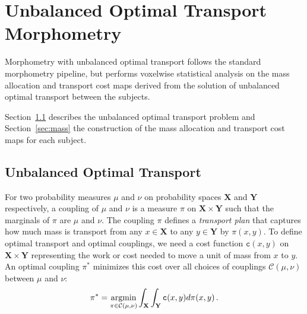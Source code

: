 \documentclass{llncs}
\newcommand{\cost}[0]{\mathtt{c}}
\newcommand{\coupling}[0]{\pi}
\def\argmin{\mathop{\rm argmin}}
\newcommand{\Xsp}{{\mathbf{X}}}
\newcommand{\Ysp}{{\mathbf{Y}}}
\begin{document}
\section{Unbalanced Optimal Transport Morphometry}
Morphometry with unbalanced optimal transport follows the standard morphometry
pipeline, but performs voxelwise statistical analysis on the mass allocation
and transport cost maps derived from the solution of unbalanced optimal
transport between the subjects.

Section~\ref{sec:unbalanced} describes the unbalanced optimal transport problem
and Section~\ref{sec:mass} the construction of the mass allocation and
transport cost maps for each subject.

\subsection{Unbalanced Optimal Transport}
\label{sec:unbalanced}
For two probability measures $\mu$ and $\nu$ on probability spaces ${\Xsp}$
and ${\Ysp}$ respectively, a coupling of $\mu$ and $\nu$ is a measure
$\coupling$ on ${\Xsp}\times{\Ysp}$ such that the marginals of $\coupling$ are
$\mu$ and $\nu$. The coupling $\coupling$ defines a {\em transport plan} that
captures how much mass is transport from any $x \in \Xsp$ to  any $y \in \Ysp$
by $\coupling(x, y)$. To define optimal transport and optimal couplings, we
need a cost function $\cost(x,y)$ on ${\Xsp}\times{\Ysp}$ representing the work
or cost needed to move a unit of mass from $x$ to $y$. An optimal coupling
$\coupling^*$ minimizes this cost over all choices of couplings
$\mathcal{C}(\mu,\nu)$ between
$\mu$ and $\nu$: 
\begin{equation}
  \coupling^*= \argmin_{\coupling\in\mathcal{C}(\mu,\nu)} \int_{{\Xsp}}\int_{{\Ysp}}
\cost(x,y)  d\coupling(x,y) \,.  
\end{equation}
\end{document}

